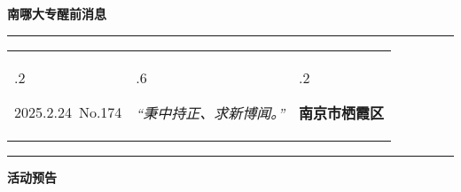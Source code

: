 \documentclass[letterpaper, 12pt]{article}
\begin{document}
\begin{center}
    \Huge\textbf{南哪大专醒前消息}
\end{center}
\vspace{4mm}
\hrule
\renewcommand\tabularxcolumn[1]{m{#1}}
\begin{tabularx}{\textwidth}{>{\hsize.2\hsize}X>{\hsize.6\hsize}X>{\hsize.2\hsize}X}
    \begin{flushleft}
        2025.2.24\, No.174
    \end{flushleft}
    &
    \begin{center}
        \textit{“秉中持正、求新博闻。”}
    \end{center}
    &
    \begin{flushright}
        \textbf{南京市栖霞区}
    \end{flushright}
\end{tabularx}
\vspace{-3.5mm}
\hrule
\vspace{4mm}
\centerline{\huge\textbf{活动预告}}
\end{document}
